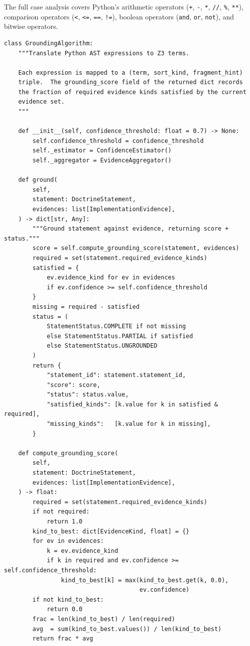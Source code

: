 \documentclass[11pt]{article}
\newcommand{\GroundAlg}{\textsc{Grounding}}  %
\begin{document}
\noindent
The full case analysis covers Python's arithmetic operators
(\lstinline{+}, \lstinline{-}, \lstinline{*}, \lstinline{//},
\lstinline{%}, \lstinline{**}),
comparison operators
(\lstinline{<}, \lstinline{<=}, \lstinline{==}, \lstinline{!=}),
boolean operators (\lstinline{and}, \lstinline{or}, \lstinline{not}),
and bitwise operators.

\begin{lstlisting}[style=jugeo-python,
  caption={Core \GroundAlg{} class from
  \texttt{doctrine\_completion/algorithms.py}.},
  label={lst:grounding}]
class GroundingAlgorithm:
    """Translate Python AST expressions to Z3 terms.

    Each expression is mapped to a (term, sort_kind, fragment_hint)
    triple.  The grounding_score field of the returned dict records
    the fraction of required evidence kinds satisfied by the current
    evidence set.
    """

    def __init__(self, confidence_threshold: float = 0.7) -> None:
        self.confidence_threshold = confidence_threshold
        self._estimator = ConfidenceEstimator()
        self._aggregator = EvidenceAggregator()

    def ground(
        self,
        statement: DoctrineStatement,
        evidences: list[ImplementationEvidence],
    ) -> dict[str, Any]:
        """Ground statement against evidence, returning score + status."""
        score = self.compute_grounding_score(statement, evidences)
        required = set(statement.required_evidence_kinds)
        satisfied = {
            ev.evidence_kind for ev in evidences
            if ev.confidence >= self.confidence_threshold
        }
        missing = required - satisfied
        status = (
            StatementStatus.COMPLETE if not missing
            else StatementStatus.PARTIAL if satisfied
            else StatementStatus.UNGROUNDED
        )
        return {
            "statement_id": statement.statement_id,
            "score": score,
            "status": status.value,
            "satisfied_kinds": [k.value for k in satisfied & required],
            "missing_kinds":   [k.value for k in missing],
        }

    def compute_grounding_score(
        self,
        statement: DoctrineStatement,
        evidences: list[ImplementationEvidence],
    ) -> float:
        required = set(statement.required_evidence_kinds)
        if not required:
            return 1.0
        kind_to_best: dict[EvidenceKind, float] = {}
        for ev in evidences:
            k = ev.evidence_kind
            if k in required and ev.confidence >= self.confidence_threshold:
                kind_to_best[k] = max(kind_to_best.get(k, 0.0),
                                      ev.confidence)
        if not kind_to_best:
            return 0.0
        frac = len(kind_to_best) / len(required)
        avg  = sum(kind_to_best.values()) / len(kind_to_best)
        return frac * avg
\end{lstlisting}
\end{document}
